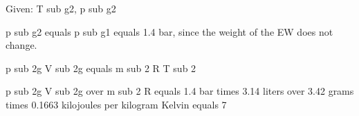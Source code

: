 Given: T sub g2, p sub g2

p sub g2 equals p sub g1 equals 1.4 bar, since the weight of the EW does not change.

p sub 2g V sub 2g equals m sub 2 R T sub 2

p sub 2g V sub 2g over m sub 2 R equals 1.4 bar times 3.14 liters over 3.42 grams times 0.1663 kilojoules per kilogram Kelvin equals 7